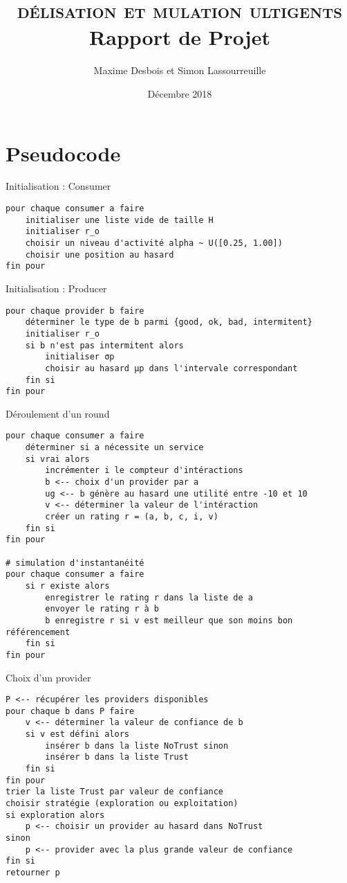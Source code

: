 \documentclass{article}
\title{%
    \vspace*{\fill}
    \textbf{\scshape \tcol{Mo}délisation et \tcol{Si}mulation \tcol{M}ulti\tcol{A}gents}\\
    Rapport de Projet
}
\author{
    Maxime Desbois et Simon Lassourreuille
}
\date{
    Décembre 2018
    \vspace*{\fill}
}
\begin{document}
\maketitle

\clearpage

\section{Pseudocode}

\begin{pseudocode}{Initialisation : Consumer}
\begin{verbatim}
pour chaque consumer a faire
    initialiser une liste vide de taille H
    initialiser r_o
    choisir un niveau d'activité alpha ~ U([0.25, 1.00])
    choisir une position au hasard
fin pour
\end{verbatim}
\end{pseudocode}

\begin{pseudocode}{Initialisation : Producer}
\begin{verbatim}
pour chaque provider b faire
    déterminer le type de b parmi {good, ok, bad, intermitent}
    initialiser r_o
    si b n'est pas intermitent alors
        initialiser σp
        choisir au hasard μp dans l'intervale correspondant
    fin si
fin pour
\end{verbatim}
\end{pseudocode}

\begin{pseudocode}{Déroulement d'un round}
\begin{verbatim}
pour chaque consumer a faire
    déterminer si a nécessite un service
    si vrai alors
        incrémenter i le compteur d'intéractions
        b <-- choix d'un provider par a
        ug <-- b génère au hasard une utilité entre -10 et 10
        v <-- déterminer la valeur de l'intéraction
        créer un rating r = (a, b, c, i, v)
    fin si
fin pour

# simulation d'instantanéité
pour chaque consumer a faire
    si r existe alors
        enregistrer le rating r dans la liste de a
        envoyer le rating r à b
        b enregistre r si v est meilleur que son moins bon référencement
    fin si
fin pour
\end{verbatim}
\end{pseudocode}

\begin{pseudocode}{Choix d'un provider}
\begin{verbatim}
P <-- récupérer les providers disponibles
pour chaque b dans P faire
    v <-- déterminer la valeur de confiance de b
    si v est défini alors
        insérer b dans la liste NoTrust sinon
        insérer b dans la liste Trust
    fin si
fin pour
trier la liste Trust par valeur de confiance
choisir stratégie (exploration ou exploitation)
si exploration alors
    p <-- choisir un provider au hasard dans NoTrust
sinon
    p <-- provider avec la plus grande valeur de confiance
fin si
retourner p
\end{verbatim}
\end{pseudocode}
\end{document}
